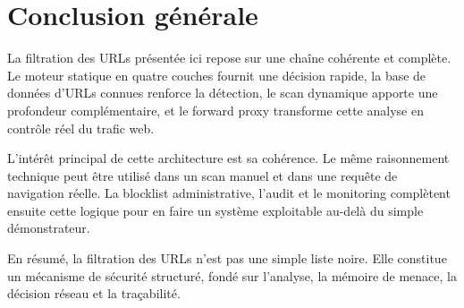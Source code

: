 ﻿\documentclass[12pt,a4paper]{report}
\begin{document}
\chapter*{Conclusion générale}

La filtration des URLs présentée ici repose sur une chaîne cohérente et complète. Le moteur statique en quatre couches fournit une décision rapide, la base de données d'URLs connues renforce la détection, le scan dynamique apporte une profondeur complémentaire, et le forward proxy transforme cette analyse en contrôle réel du trafic web.

L'intérêt principal de cette architecture est sa cohérence. Le même raisonnement technique peut être utilisé dans un scan manuel et dans une requête de navigation réelle. La blocklist administrative, l'audit et le monitoring complètent ensuite cette logique pour en faire un système exploitable au-delà du simple démonstrateur.

En résumé, la filtration des URLs n'est pas une simple liste noire. Elle constitue un mécanisme de sécurité structuré, fondé sur l'analyse, la mémoire de menace, la décision réseau et la traçabilité.
\end{document}
